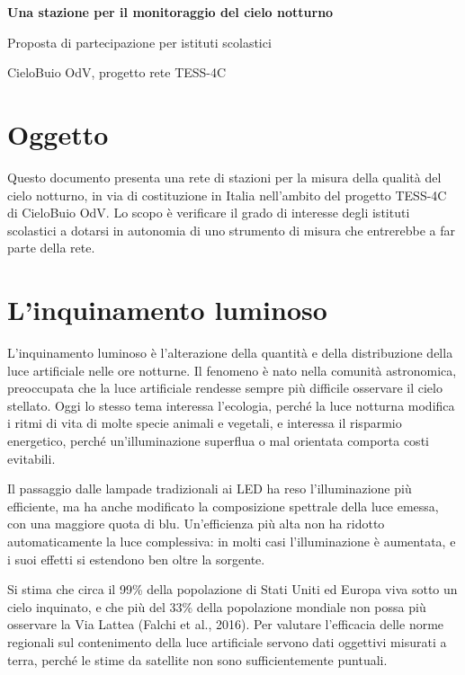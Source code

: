 \documentclass[11pt,a4paper]{report}
\begin{document}
\begin{center}

{\LARGE\bfseries\color{nightblue} Una stazione per il monitoraggio del cielo notturno\par}

\vspace{0.2cm}

{\large Proposta di partecipazione per istituti scolastici\par}

\vspace{0.1cm}

{\small CieloBuio OdV, progetto rete TESS-4C}

\end{center}

\section*{Oggetto}

Questo documento presenta una rete di stazioni per la misura della qualità del cielo notturno, in via di costituzione in Italia nell'ambito del progetto TESS-4C di CieloBuio OdV. Lo scopo è verificare il grado di interesse degli istituti scolastici a dotarsi in autonomia di uno strumento di misura che entrerebbe a far parte della rete.

\section*{L'inquinamento luminoso}

L'inquinamento luminoso è l'alterazione della quantità e della distribuzione della luce artificiale nelle ore notturne. Il fenomeno è nato nella comunità astronomica, preoccupata che la luce artificiale rendesse sempre più difficile osservare il cielo stellato. Oggi lo stesso tema interessa l'ecologia, perché la luce notturna modifica i ritmi di vita di molte specie animali e vegetali, e interessa il risparmio energetico, perché un'illuminazione superflua o mal orientata comporta costi evitabili.

Il passaggio dalle lampade tradizionali ai LED ha reso l'illuminazione più efficiente, ma ha anche modificato la composizione spettrale della luce emessa, con una maggiore quota di blu. Un'efficienza più alta non ha ridotto automaticamente la luce complessiva: in molti casi l'illuminazione è aumentata, e i suoi effetti si estendono ben oltre la sorgente.

Si stima che circa il 99\% della popolazione di Stati Uniti ed Europa viva sotto un cielo inquinato, e che più del 33\% della popolazione mondiale non possa più osservare la Via Lattea (Falchi et al., 2016). Per valutare l'efficacia delle norme regionali sul contenimento della luce artificiale servono dati oggettivi misurati a terra, perché le stime da satellite non sono sufficientemente puntuali.
\end{document}
